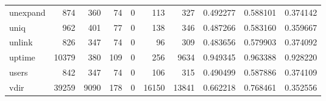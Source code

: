 \begin{tabular}{lrrrrrrrrr}
unexpand  &                                 874 &                                             360 &                                             74 &                                             0 &                                            113 &                                          327 &                                           0.492277 &                               0.588101 &                             0.374142 \\
uniq      &                                 962 &                                             401 &                                             77 &                                             0 &                                            138 &                                          346 &                                           0.487266 &                               0.583160 &                             0.359667 \\
unlink    &                                 826 &                                             347 &                                             74 &                                             0 &                                             96 &                                          309 &                                           0.483656 &                               0.579903 &                             0.374092 \\
uptime    &                               10379 &                                             380 &                                            109 &                                             0 &                                            256 &                                         9634 &                                           0.949345 &                               0.963388 &                             0.928220 \\
users     &                                 842 &                                             347 &                                             74 &                                             0 &                                            106 &                                          315 &                                           0.490499 &                               0.587886 &                             0.374109 \\
vdir      &                               39259 &                                            9090 &                                            178 &                                             0 &                                          16150 &                                        13841 &                                           0.662218 &                               0.768461 &                             0.352556 \\

\end{tabular}
